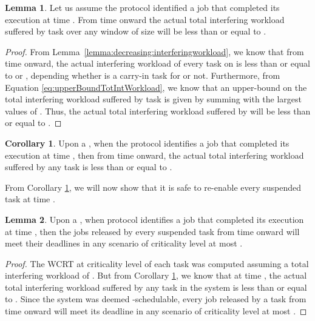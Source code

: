 \documentclass[10pt, conference, compsocconf, final]{IEEEtran}
\theoremstyle{definition}
\newtheorem{lemma}{Lemma}
\newtheorem{corollary}{Corollary}
\begin{document}
{\begin{lemma}\label{lemma:decreasing:totalInterferingWorkload}
Let us assume the protocol identified a job  that completed its execution at time . From time  onward the actual total interfering workload  suffered by task  over any window of size  will be less than or equal to .
\end{lemma}
\begin{proof}
From Lemma~\ref{lemma:decreasing:interferingworkload}, we know that from time  onward, the actual interfering workload of every task  on  is less than or equal to  or , depending whether  is a carry-in task for  or not. Furthermore, from Equation \ref{eq:upperBoundTotIntWorkload}, we know that an upper-bound on the total interfering workload suffered by task  is given by summing   with the  largest values of . Thus, the actual total interfering workload suffered by  will be less than or equal to .
\end{proof}

\begin{corollary}\label{decreasing:corollaryTotIntWork}
Upon a , when the protocol identifies a job  that completed its execution at time , then from time  onward, the actual total interfering workload suffered by any task  is less than or equal to .
\end{corollary}

From Corollary \ref{decreasing:corollaryTotIntWork}, we will now show that it is safe to re-enable every suspended task  at time .

\begin{lemma}\label{lemma:decreasing:safeNewModeTasks}
Upon a , when protocol identifies a job  that completed its execution at time , then the jobs released by every suspended task  from time  onward will meet their deadlines in any scenario of criticality level at most .
\end{lemma}
\begin{proof}
The WCRT at criticality level  of each task  was computed assuming a total interfering workload of . But from Corollary \ref{decreasing:corollaryTotIntWork}, we know that at time , the actual total interfering workload suffered by any task  in the system is less than or equal to . Since the system was deemed -schedulable, every job released by a task  from time  onward will meet its deadline in any scenario of criticality level at most .
\end{proof}

}
\end{document}

